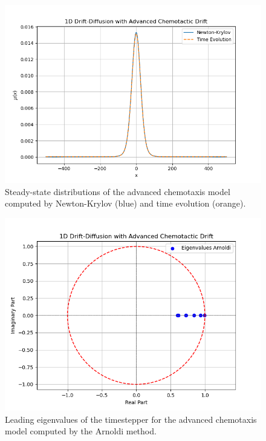 \documentclass{article}
\begin{document}
\begin{figure}[ht]
    \centering
    \includegraphics[width=0.8\linewidth]{figures/Advanced Chemotaxis Steady State.png}
    \caption{Steady-state distributions of the advanced chemotaxis model computed by Newton-Krylov (blue) and time evolution (orange).}
    \label{fig:advanced_chemotaxis_ss}
\end{figure}

\begin{figure}[ht]
    \centering
    \includegraphics[width=0.8\linewidth]{figures/Advanced Chemotaxis Eigenvalues.png}
    \caption{Leading eigenvalues of the timestepper for the advanced chemotaxis model computed by the Arnoldi method.}
    \label{fig:advanced_chemotaxis_arnoldi}
\end{figure}
\end{document}
